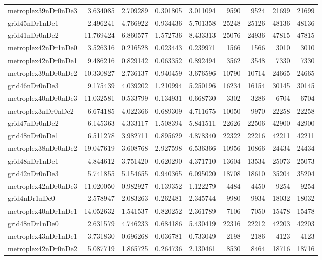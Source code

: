 \begin{longtable}{|l|r|r|r|r|r|r|r|r|}
metroplex39nDr0nDe3 & 3.634085 & 2.709289 & 0.301805 & 3.011094 & 9590 & 9524 & 21699 & 21699 \\
grid45nDr1nDe1 & 2.496241 & 4.766922 & 0.934436 & 5.701358 & 25248 & 25126 & 48136 & 48136 \\
grid41nDr0nDe2 & 11.769424 & 6.860577 & 1.572736 & 8.433313 & 25076 & 24936 & 47815 & 47815 \\
metroplex42nDr1nDe0 & 3.526316 & 0.216528 & 0.023443 & 0.239971 & 1566 & 1566 & 3010 & 3010 \\
metroplex42nDr0nDe1 & 9.486216 & 0.829142 & 0.063352 & 0.892494 & 3562 & 3548 & 7330 & 7330 \\
metroplex39nDr0nDe2 & 10.330827 & 2.736137 & 0.940459 & 3.676596 & 10790 & 10714 & 24665 & 24665 \\
grid46nDr0nDe3 & 9.175439 & 4.039202 & 1.210994 & 5.250196 & 16234 & 16154 & 30145 & 30145 \\
metroplex40nDr0nDe3 & 11.032581 & 0.533799 & 0.134931 & 0.668730 & 3302 & 3286 & 6704 & 6704 \\
metroplex3nDr0nDe2 & 6.674185 & 4.022366 & 0.689309 & 4.711675 & 10050 & 9970 & 22258 & 22258 \\
grid47nDr0nDe2 & 6.145363 & 4.333117 & 1.508394 & 5.841511 & 22626 & 22506 & 42900 & 42900 \\
grid48nDr0nDe1 & 6.511278 & 3.982711 & 0.895629 & 4.878340 & 22322 & 22216 & 42211 & 42211 \\
metroplex38nDr0nDe2 & 19.047619 & 3.608768 & 2.927598 & 6.536366 & 10956 & 10866 & 24434 & 24434 \\
grid48nDr1nDe1 & 4.844612 & 3.751420 & 0.620290 & 4.371710 & 13604 & 13534 & 25073 & 25073 \\
grid42nDr0nDe3 & 5.741855 & 5.154655 & 0.940365 & 6.095020 & 18708 & 18610 & 35204 & 35204 \\
metroplex42nDr0nDe3 & 11.020050 & 0.982927 & 0.139352 & 1.122279 & 4484 & 4450 & 9254 & 9254 \\
grid4nDr1nDe0 & 2.578947 & 2.083263 & 0.262481 & 2.345744 & 9980 & 9934 & 18032 & 18032 \\
metroplex40nDr1nDe1 & 14.052632 & 1.541537 & 0.820252 & 2.361789 & 7106 & 7050 & 15478 & 15478 \\
grid48nDr1nDe0 & 2.631579 & 4.746233 & 0.684186 & 5.430419 & 22316 & 22212 & 42203 & 42203 \\
metroplex43nDr1nDe1 & 3.731830 & 0.696268 & 0.036781 & 0.733049 & 2198 & 2186 & 4123 & 4123 \\
metroplex42nDr0nDe2 & 5.087719 & 1.865725 & 0.264736 & 2.130461 & 8530 & 8464 & 18716 & 18716 \\

\end{longtable}
